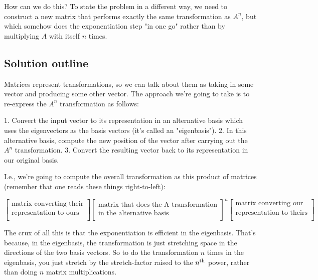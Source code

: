 How can we do this? To state the problem in a different way, we need to
construct a new matrix that performs exactly the same transformation as $A^n$,
but which somehow does the exponentiation step "in one go" rather than by
multiplying $A$ with itself $n$ times.

\subsection{Solution outline}

Matrices represent transformations, so we can talk about them as taking in some
vector and producing some other vector. The approach we're going to take is to
re-express the $A^n$ transformation as follows:

1. Convert the input vector to its representation in an alternative basis which
   uses the eigenvectors as the basis vectors (it's called an "eigenbasis").
2. In this alternative basis, compute the new position of the vector after
   carrying out the $A^n$ transformation.
3. Convert the resulting vector back to its representation in our original
   basis.

I.e., we're going to compute the overall transformation as this product of
matrices (remember that one reads these things right-to-left):

$$
\begin{bmatrix}\text{matrix converting their}\\\text{representation to ours} \\ \end{bmatrix}
\begin{bmatrix}\text{matrix that does the A transformation}\\\text{in the alternative basis} \\ \end{bmatrix}^n
\begin{bmatrix}\text{matrix converting our}\\\text{representation to theirs} \\ \end{bmatrix}
$$

The crux of all this is that the exponentiation is efficient in the
eigenbasis. That's because, in the eigenbasis, the transformation is just
stretching space in the directions of the two basis vectors. So to do the
transformation $n$ times in the eigenbasis, you just stretch by the
stretch-factor raised to the $n^{\text{th}}$ power, rather than doing $n$ matrix
multiplications.

